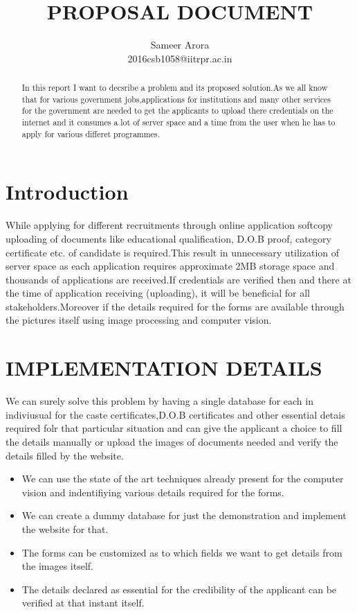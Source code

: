 \documentclass[journal]{IEEEtran}
\begin{document}
\title{ PROPOSAL DOCUMENT }

\author{
\Large{Sameer Arora}\\
2016csb1058@iitrpr.ac.in
}

\large{
\tableofcontents
}
\maketitle

\begin{abstract}
In this report I want to decsribe a problem and its proposed solution.As we all know that for various government jobs,applications for institutions and many other services for the government are needed to get the applicants to upload there credentials on the internet and it consumes a lot of server space and a time from the user when he has to apply for various differet programmes. 
\end{abstract}

\section{Introduction}
 While applying for different recruitments through online application softcopy uploading of documents like educational qualification, D.O.B proof, category certificate etc. of candidate is required.This result in unnecessary utilization of server space as each application requires approximate 2MB storage space and thousands of applications are received.If credentials are verified then and there at the time of application receiving (uploading), it will be beneficial for all stakeholders.Moreover if the details required for the forms are available through the pictures itself using image processing and computer vision.
 
\section{IMPLEMENTATION DETAILS}
We can surely solve this problem by having a single database for each in indiviusual for the caste certificates,D.O.B certificates and other essential detais required folr that particular situation and can give the applicant a choice to fill the details manually or upload the images of documents needed and verify the details filled by the website.
\begin{itemize}
\item We can use the state of the art techniques already present for the computer vision and indentifiying various details required for the forms.
\item We can create a dummy database for just the demonstration and implement the website for that.
\item The forms can be customized as to which fields we want to get details from the images itself. 
\item The details declared as essential for the credibility of the applicant can be verified at that instant itself.
\end{itemize}
  
\end{document}
